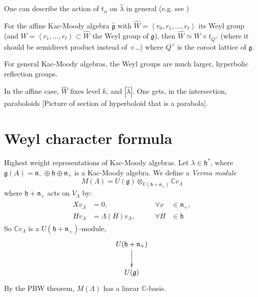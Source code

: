 One can describe the action of $t_\alpha$ on
$\hat{\lambda}$ in general
(e.g. see \cite[Chapter 6]{IDLA})

\begin{proposition}
\label{proposition-weyl-group-affin-kac}
For the affine Kac-Moody algebra
$\hat{\mathfrak{g}}$
 with
 $\hat{W}=\left\langle{}r_0,r_1,\ldots,r_\ell\right\rangle{}$
 its Weyl group
(and $W=\left\langle{}r_1,\ldots,r_\ell\right\rangle{}\subset
\hat{W}$ the Weyl group of
$\mathfrak{g}$), then $\hat{W} \simeq W\times
t_{Q^\vee}$ (where it should be
semidirect product instead of $\times$…)
where $Q^\vee$ is the
coroot lattice of $\mathfrak{g}$.
\end{proposition}

\begin{remark}
\label{remark-weyl-group-large-other-kac}
For general Kac-Moody algebras, the Weyl
groups are much larger, hyperbolic
reflection groups.
\end{remark}

In the affine case, $\hat{W}$ fixes level
$k$, and $|\hat{\lambda}|$. One gets,
in the intersection, paraboloids [Picture of
section of hyperboloid that is a
parabola].

\section{Weyl character formula}
\label{section-Weyl-character-formula}
Highest weight representations of Kac-Moody
algebras.
Let $\lambda \in \mathfrak{h}^*$, where
$\mathfrak{g}(A)=\mathfrak{n}_-
\oplus\mathfrak{h}\oplus
\mathfrak{n}_+$
is a Kac-Moody algebra. We define a {\it
Verma module}
$$
M(\Lambda)
=U(\mathfrak{g})
\otimes_{U(\mathfrak{h}+\mathfrak{n}_+)}
\mathbb{C}v_\Lambda
$$
where $\mathfrak{h}+\mathfrak{n}_+$ acts on
$V_\Lambda$ by:
\begin{align*}
\begin{aligned}
Xv_\Lambda&=0,\qquad &\forall x &\in
\mathfrak{n}_+,\\
Hv_\Lambda&=\Lambda(H)v_\Lambda,\qquad
&\forall H &\in \mathfrak{h}
\end{aligned}
\end{align*}
So $\mathbb{C} v_\Lambda$ is a
$U(\mathfrak{h}+\mathfrak{n}_+)$-module,
$$
\xymatrix{
U(\mathfrak{h}+\mathfrak{n}_+)\ar[d]\\
U(\mathfrak{g})
}
$$
By the PBW theorem, $M(\Lambda)$ has a linear
$\mathbb{C}$-basis.

